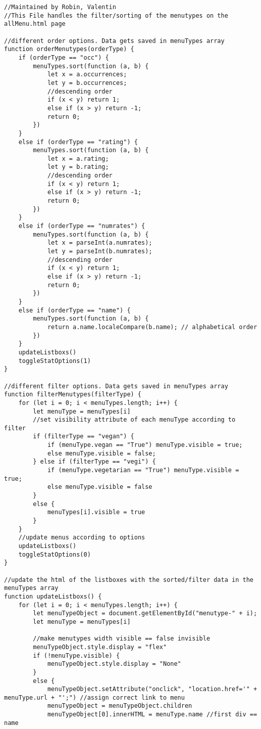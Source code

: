 \begin{lstlisting}
//Maintained by Robin, Valentin
//This File handles the filter/sorting of the menutypes on the allMenu.html page

//different order options. Data gets saved in menuTypes array
function orderMenutypes(orderType) {
    if (orderType == "occ") {
        menuTypes.sort(function (a, b) {
            let x = a.occurrences;
            let y = b.occurrences;
            //descending order
            if (x < y) return 1;
            else if (x > y) return -1;
            return 0;
        })
    }
    else if (orderType == "rating") {
        menuTypes.sort(function (a, b) {
            let x = a.rating;
            let y = b.rating;
            //descending order
            if (x < y) return 1;
            else if (x > y) return -1;
            return 0;
        })
    }
    else if (orderType == "numrates") {
        menuTypes.sort(function (a, b) {
            let x = parseInt(a.numrates);
            let y = parseInt(b.numrates);
            //descending order
            if (x < y) return 1;
            else if (x > y) return -1;
            return 0;
        })
    }
    else if (orderType == "name") {
        menuTypes.sort(function (a, b) {
            return a.name.localeCompare(b.name); // alphabetical order
        })
    }
    updateListboxs()
    toggleStatOptions(1)
}

//different filter options. Data gets saved in menuTypes array
function filterMenutypes(filterType) {
    for (let i = 0; i < menuTypes.length; i++) {
        let menuType = menuTypes[i]
        //set visibility attribute of each menuType according to filter
        if (filterType == "vegan") {
            if (menuType.vegan == "True") menuType.visible = true;
            else menuType.visible = false;
        } else if (filterType == "vegi") {
            if (menuType.vegetarian == "True") menuType.visible = true;
            else menuType.visible = false
        }
        else {
            menuTypes[i].visible = true
        }
    }
    //update menus according to options
    updateListboxs()
    toggleStatOptions(0)
}

//update the html of the listboxes with the sorted/filter data in the menuTypes array
function updateListboxs() {
    for (let i = 0; i < menuTypes.length; i++) {
        let menuTypeObject = document.getElementById("menutype-" + i);
        let menuType = menuTypes[i]

        //make menutypes width visible == false invisible
        menuTypeObject.style.display = "flex"
        if (!menuType.visible) {
            menuTypeObject.style.display = "None"
        }
        else {
            menuTypeObject.setAttribute("onclick", "location.href='" + menuType.url + "';") //assign correct link to menu
            menuTypeObject = menuTypeObject.children
            menuTypeObject[0].innerHTML = menuType.name //first div == name


\end{lstlisting}
